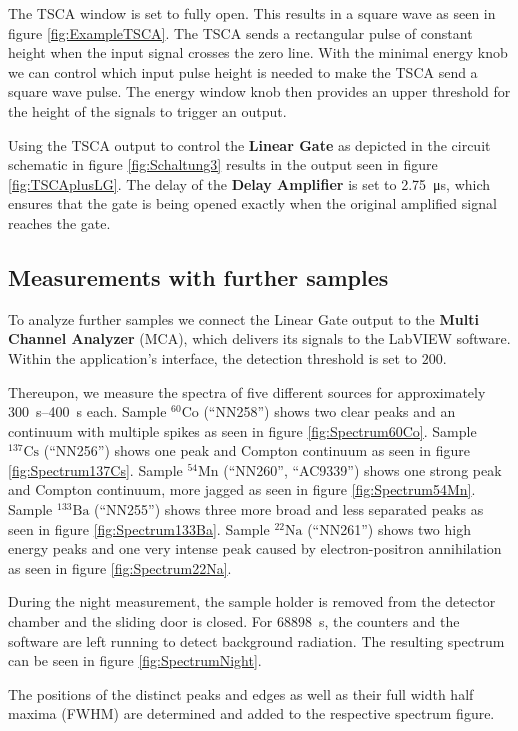 The TSCA window is set to fully open.
This results in a square wave as seen in figure \ref{fig:ExampleTSCA}.
The TSCA sends a rectangular pulse of constant height when the input signal crosses the zero line.
With the minimal energy knob we can control which input pulse height is needed to make the TSCA send a square wave pulse.
The energy window knob then provides an upper threshold for the height of the signals to trigger an output.
%
\par
%
Using the TSCA output to control the \textbf{Linear Gate} as depicted in the circuit schematic in figure \ref{fig:Schaltung3} results in the output seen in figure \ref{fig:TSCAplusLG}.
The delay of the \textbf{Delay Amplifier} is set to \SI{2.75}{\micro\second}, which ensures that the gate is being opened exactly when the original amplified signal reaches the gate.
%
\subsection*{Measurements with further samples}
%
To analyze further samples we connect the Linear Gate output to the \textbf{Multi Channel Analyzer} (MCA), which delivers its signals to the LabVIEW software.
Within the application's interface, the detection threshold is set to $200$.
%
\par
%
Thereupon, we measure the spectra of five different sources for approximately \SIrange{300}{400}{\second} each.
Sample $^{60}\text{Co}$ (\enquote{NN258}) shows two clear peaks and an continuum with multiple spikes as seen in figure \ref{fig:Spectrum60Co}.
Sample $^{137}\text{Cs}$ (\enquote{NN256}) shows one peak and Compton continuum as seen in figure \ref{fig:Spectrum137Cs}.
Sample $^{54}\text{Mn}$ (\enquote{NN260}, \enquote{AC9339}) shows one strong peak and Compton continuum, more jagged as seen in figure \ref{fig:Spectrum54Mn}.
Sample $^{133}\text{Ba}$ (\enquote{NN255}) shows three more broad and less separated peaks as seen in figure \ref{fig:Spectrum133Ba}.
Sample $^{22}\text{Na}$ (\enquote{NN261}) shows two high energy peaks and one very intense peak caused by electron-positron annihilation as seen in figure \ref{fig:Spectrum22Na}.
%
\par
%
During the night measurement, the sample holder is removed from the detector chamber and the sliding door is closed.
For \SI{68898}{\second}, the counters and the software are left running to detect background radiation.
The resulting spectrum can be seen in figure \ref{fig:SpectrumNight}.
%
\par
%
The positions of the distinct peaks and edges as well as their full width half maxima (FWHM) are determined and added to the respective spectrum figure.
%
